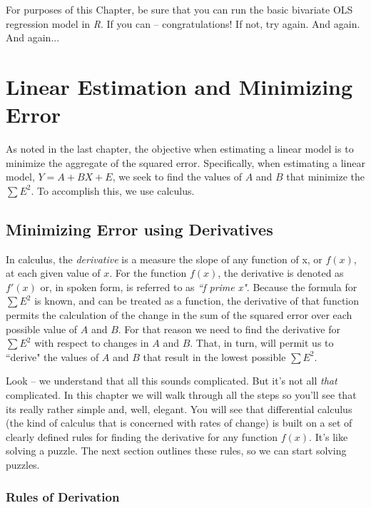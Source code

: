\documentclass[11pt,openany]{book}\usepackage[]{graphicx}\usepackage[]{color}
\begin{document}
For purposes of this Chapter, be sure that you can run the basic bivariate OLS regression model in \textit{R}. If you can -- congratulations! If not, try again. And again. And again...




\chapter{Linear Estimation and Minimizing Error} 

As noted in the last chapter, the objective when estimating a linear model is to minimize the aggregate of the squared error. Specifically, when estimating a linear model, $Y=A+BX+E$, we seek to find the values of $A$ and $B$ that minimize the $\sum E^{2}$. To accomplish this, we use calculus. 

\section{Minimizing Error using Derivatives}

In calculus, the \textit{derivative} is a measure the slope of any function of x, or $f(x)$, at each given value of $x$. For the function $f(x)$, the derivative is denoted as $f'(x)$ or, in spoken form, is referred to as \textit{``f prime x"}. Because the formula for $\sum E^{2}$ is known, and can be treated as a function, the derivative of that function permits the calculation of the change in the sum of the squared error over each possible value of $A$ and $B$. For that reason we need to find the derivative for $\sum E^{2}$ with respect to changes in $A$ and $B$. That, in turn, will permit us to ``derive" the values of $A$ and $B$ that result in the lowest possible $\sum E^{2}$.

Look -- we understand that all this sounds complicated. But it's not all \textit{that} complicated. In this chapter we will walk through all the steps so you'll see that its really rather simple and, well, elegant. You will see that differential calculus (the kind of calculus that is concerned with rates of change) is built on a set of clearly defined rules for finding the derivative for any function $f(x)$. It's like solving a puzzle. The next section outlines these rules, so we can start solving puzzles. 

\subsection{Rules of Derivation} 
\end{document}
